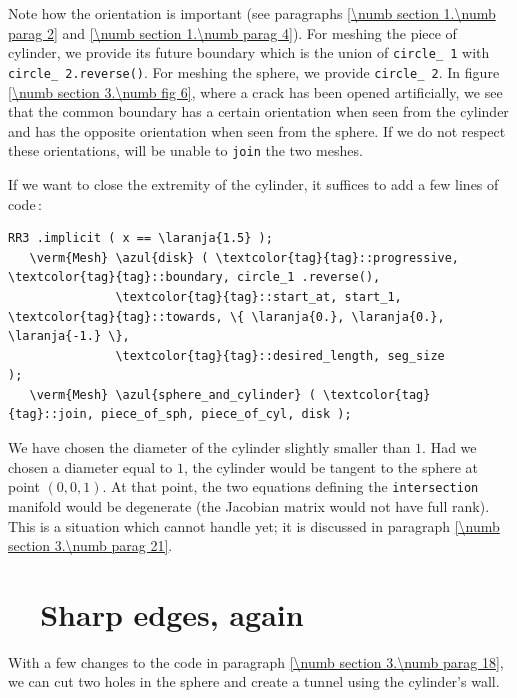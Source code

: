 Note how the orientation is important (see paragraphs \ref{\numb section 1.\numb parag 2}
and \ref{\numb section 1.\numb parag 4}).
For meshing the piece of cylinder, we provide its future boundary which is the union of
{\small\tt circle\_\,1} with {\small\tt circle\_\,2.reverse()}.
For meshing the sphere, we provide {\small\tt circle\_\,2}.
In figure \ref{\numb section 3.\numb fig 6}, where a crack has been opened artificially,
we see that the common boundary has a certain orientation when seen from the cylinder and
has the opposite orientation when seen from the sphere.
If we do not respect these orientations, {\maniFEM} will be unable to {\small\tt join} the two
meshes.

If we want to close the extremity of the cylinder, it suffices to add a few lines of code$\,$:

\begin{Verbatim}[commandchars=\\\{\},formatcom=\small\tt,
   baselinestretch=0.94,framesep=2mm                     ]
   RR3 .implicit ( x == \laranja{1.5} );
   \verm{Mesh} \azul{disk} ( \textcolor{tag}{tag}::progressive, \textcolor{tag}{tag}::boundary, circle_1 .reverse(),
               \textcolor{tag}{tag}::start_at, start_1, \textcolor{tag}{tag}::towards, \{ \laranja{0.}, \laranja{0.}, \laranja{-1.} \},
               \textcolor{tag}{tag}::desired_length, seg_size                         );
   \verm{Mesh} \azul{sphere_and_cylinder} ( \textcolor{tag}{tag}::join, piece_of_sph, piece_of_cyl, disk );
\end{Verbatim}

We have chosen the diameter of the cylinder slightly smaller than $1$.
Had we chosen a diameter equal to $1$, the cylinder would be tangent to the sphere at point
$ (0,0,1) $.
At that point, the two equations defining the {\small\tt intersection} manifold would be
degenerate (the Jacobian matrix would not have full rank).
This is a situation which {\maniFEM} cannot handle yet; it is discussed in paragraph
\ref{\numb section 3.\numb parag 21}.


\section{~~Sharp edges, again}\label{\numb section 3.\numb parag 19}

With a few changes to the code in paragraph \ref{\numb section 3.\numb parag 18},
we can cut two holes in the sphere and create a tunnel using the cylinder's wall.
\medskip

